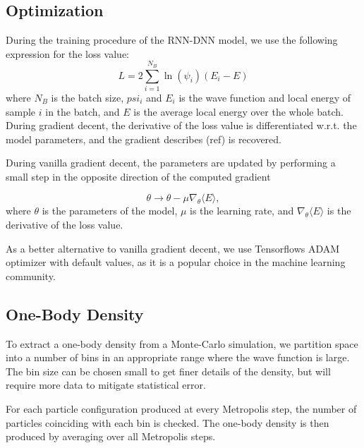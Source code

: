 \subsection{Optimization}
During the training procedure of the RNN-DNN model, we use the following expression for the loss value:
\begin{equation*}
	L = 2\sum_{i=1}^{N_B}\ln(\psi_i) (E_i - E)
\end{equation*}
where $N_B$ is the batch size, $psi_i$ and $E_i$ is the wave function and local energy of sample $i$ in the batch, and $E$ is the average local energy over the whole batch. During gradient decent, the derivative of the loss value is differentiated w.r.t. the model parameters, and the gradient describes (ref) is recovered.

During vanilla gradient decent, the parameters are updated by performing a small step in the opposite direction of the computed gradient

\begin{equation*}
	\theta \rightarrow \theta - \mu \nabla_\theta \langle E \rangle,
\end{equation*}
where $\theta$ is the parameters of the model, $\mu$ is the learning rate, and $\nabla_\theta \langle E \rangle$ is the derivative of the loss value. 

As a better alternative to vanilla gradient decent, we use Tensorflows ADAM optimizer with default values, as it is a popular choice in the machine learning community.  

\subsection{One-Body Density}
To extract a one-body density from a Monte-Carlo simulation, we partition space into a number of bins in an appropriate range where the wave function is large. The bin size can be chosen small to get finer details of the density, but will require more data to mitigate statistical error.

For each particle configuration produced at every Metropolis step, the number of particles coinciding with each bin is checked. The one-body density is then produced by averaging over all Metropolis steps.


